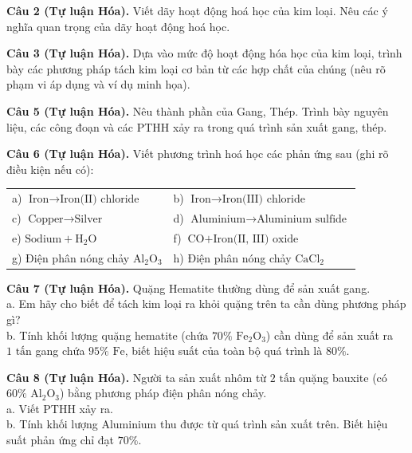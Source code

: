\documentclass{article}
\begin{document}
\fontsize{26}{34}\selectfont
\textbf{Câu 2 (Tự luận Hóa).} Viết dãy hoạt động hoá học của kim loại. Nêu các ý nghĩa quan trọng của dãy hoạt động hoá học.
\vspace*{\fill}
\newpage

\fontsize{26}{34}\selectfont
\textbf{Câu 3 (Tự luận Hóa).} Dựa vào mức độ hoạt động hóa học của kim loại, trình bày các phương pháp tách kim loại cơ bản từ các hợp chất của chúng (nêu rõ phạm vi áp dụng và ví dụ minh họa).
\vspace*{\fill}
\newpage

\fontsize{25}{33}\selectfont
\textbf{Câu 5 (Tự luận Hóa).} Nêu thành phần của Gang, Thép. Trình bày nguyên liệu, các công đoạn và các PTHH xảy ra trong quá trình sản xuất gang, thép.
\vspace*{\fill}
\newpage

\fontsize{25}{33}\selectfont
\textbf{Câu 6 (Tự luận Hóa).} Viết phương trình hoá học các phản ứng sau (ghi rõ điều kiện nếu có):\\
\begin{tabularx}{\linewidth}{@{}X X@{}}
a) $\text{Iron} \to \text{Iron(II) chloride}$ & b) $\text{Iron} \to \text{Iron(III) chloride}$\\[8pt]
c) $\text{Copper} \to \text{Silver}$ & d) $\text{Aluminium} \to \text{Aluminium sulfide}$\\[8pt]
e) $\text{Sodium} + \text{H}_2\text{O}$ & f) $\text{CO} + \text{Iron(II, III) oxide}$\\[8pt]
g) Điện phân nóng chảy $\text{Al}_2\text{O}_3$ & h) Điện phân nóng chảy $\text{CaCl}_2$
\end{tabularx}
\vspace*{\fill}
\newpage

\fontsize{25}{33}\selectfont
\textbf{Câu 7 (Tự luận Hóa).} Quặng Hematite thường dùng để sản xuất gang.\\
a. Em hãy cho biết để tách kim loại ra khỏi quặng trên ta cần dùng phương pháp gì?\\
b. Tính khối lượng quặng hematite (chứa $70\% \text{ Fe}_2\text{O}_3$) cần dùng để sản xuất ra $1\text{ tấn}$ gang chứa $95\%\text{ Fe}$, biết hiệu suất của toàn bộ quá trình là $80\%$.
\vspace*{\fill}
\newpage

\fontsize{25}{33}\selectfont
\textbf{Câu 8 (Tự luận Hóa).} Người ta sản xuất nhôm từ $2\text{ tấn}$ quặng bauxite (có $60\% \text{ Al}_2\text{O}_3$) bằng phương pháp điện phân nóng chảy.\\
a. Viết PTHH xảy ra.\\
b. Tính khối lượng Aluminium thu được từ quá trình sản xuất trên. Biết hiệu suất phản ứng chỉ đạt $70\%$.
\vspace*{\fill}
\newpage
\end{document}
